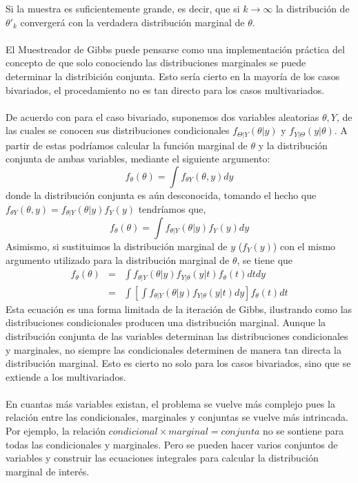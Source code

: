 Si la muestra es suficientemente grande, es decir, que si $k \rightarrow \infty$ la distribuci\'on de $\theta'_k$ converger\'a con la verdadera distribuci\'on marginal de $\theta$.\\
\\
El Muestreador de Gibbs puede pensarse como una implementaci\'on pr\'actica del concepto de que solo conociendo las distribuciones marginales se puede determinar la distribici\'on conjunta. Esto ser\'ia cierto en la mayor\'ia de los casos bivariados, el procedamiento no es tan directo para los casos multivariados.\\
\\
De acuerdo con \cite{casella1992explaining} para el caso bivariado, suponemos dos variables aleatorias $\theta,Y$, de las cuales se conocen sus distribuciones condicionales $f_{\Theta|Y}(\theta|y)$ y $f_{Y|\Theta}(y|\theta)$. A partir de estas podr\'iamos calcular la funci\'on marginal de $\theta$ y la distribuci\'on conjunta de ambas variables, mediante  el siguiente argumento:\\
\[f_\theta(\theta)=\int f_{\theta Y}(\theta,y)dy\]
donde la distribuci\'on conjunta es a\'un desconocida, tomando el hecho que $f_{\theta Y}(\theta,y)=f_{\theta|Y}(\theta|y)f_Y(y)$ tendr\'iamos que,\\
\[f_\theta(\theta)=\int f_{\theta|Y}(\theta|y)f_Y(y) dy\]
Asimismo, si sustituimos la distribuci\'on marginal de $y$ ($f_Y(y)$) con el mismo argumento utilizado para la distribuci\'on marginal de $\theta$, se tiene que
\begin{eqnarray*}
f_\theta(\theta) &=& \int f_{\theta|Y}(\theta|y) f_{Y|\theta}(y|t) f_\theta(t)dt dy\\
       &=& \int [ \int  f_{\theta|Y}(\theta|y)f_{Y|\theta}(y|t) dy]  f_\theta(t) dt
\end{eqnarray*}
Esta ecuaci\'on es una forma limitada de la iteraci\'on de Gibbs, ilustrando como las distribuciones condicionales producen una distribuci\'on marginal. Aunque la distribuci\'on conjunta de las variables determinan las distribuciones condicionales y marginales, no siempre las condicionales determinen de manera tan directa la distribuci\'on marginal. Esto es cierto no solo para los casos bivariados, sino que se extiende a los multivariados.\\
\\
En cuantas m\'as variables existan, el problema se vuelve m\'as complejo pues la relaci\'on entre las condicionales, marginales y conjuntas se vuelve m\'as intrincada. Por ejemplo, la relaci\'on $condicional \times marginal = conjunta$ no se sontiene para todas las condicionales y marginales. Pero se pueden hacer varios conjuntos de variables y construir las ecuaciones integrales para calcular la distribuci\'on marginal de inter\'es.\\
